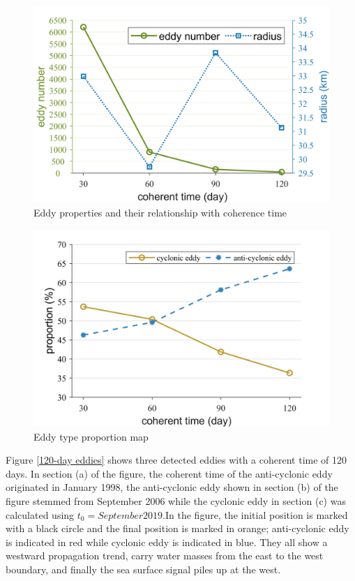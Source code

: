 \begin{figure}[htbp]
    \centering
    \includegraphics[width = 15cm]{chapter/figure/eddy coherent.png}
    \caption{Eddy properties and their relationship with coherence time}
    \label{eddy coherent}
\end{figure}

\begin{figure}[htbp]
    \centering
    \includegraphics[width = 15cm]{chapter/figure/eddy type proportion.png}
    \caption{Eddy type proportion map}
    \label{eddy type proportion}
\end{figure}

Figure \ref{120-day eddies} shows three detected eddies with a coherent time of 120 days. In section (a) of the figure, the coherent time of the anti-cyclonic eddy originated in January 1998, the anti-cyclonic eddy shown in section (b) of the figure stemmed from September 2006 while the cyclonic eddy in section (c) was calculated using $t_0= September 2019$.In the figure, the initial position is marked with a black circle and the final position is marked in orange; anti-cyclonic eddy is indicated in red while cyclonic eddy is indicated in blue. They all show a westward propagation trend, carry water masses from the east to the west boundary, and finally the sea surface signal piles up at the west. 

